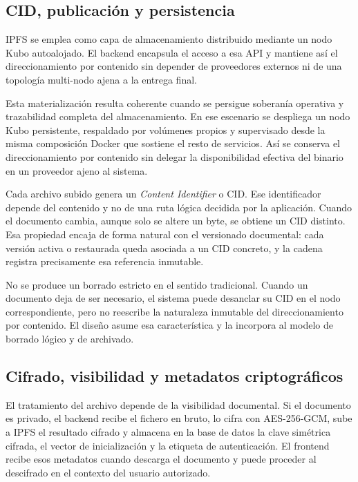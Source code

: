 \documentclass[11pt, a4paper]{article}
\begin{document}
\subsection{CID, publicación y persistencia}

IPFS se emplea como capa de almacenamiento distribuido mediante un nodo Kubo autoalojado. El backend encapsula el acceso a esa API y mantiene así el direccionamiento por contenido sin depender de proveedores externos ni de una topología multi-nodo ajena a la entrega final.

Esta materialización resulta coherente cuando se persigue soberanía operativa y trazabilidad completa del almacenamiento. En ese escenario se despliega un nodo Kubo persistente, respaldado por volúmenes propios y supervisado desde la misma composición Docker que sostiene el resto de servicios. Así se conserva el direccionamiento por contenido sin delegar la disponibilidad efectiva del binario en un proveedor ajeno al sistema.

Cada archivo subido genera un \textit{Content Identifier} o CID. Ese identificador depende del contenido y no de una ruta lógica decidida por la aplicación. Cuando el documento cambia, aunque solo se altere un byte, se obtiene un CID distinto. Esa propiedad encaja de forma natural con el versionado documental: cada versión activa o restaurada queda asociada a un CID concreto, y la cadena registra precisamente esa referencia inmutable.

No se produce un borrado estricto en el sentido tradicional. Cuando un documento deja de ser necesario, el sistema puede desanclar su CID en el nodo correspondiente, pero no reescribe la naturaleza inmutable del direccionamiento por contenido. El diseño asume esa característica y la incorpora al modelo de borrado lógico y de archivado.

\subsection{Cifrado, visibilidad y metadatos criptográficos}

El tratamiento del archivo depende de la visibilidad documental. Si el documento es privado, el backend recibe el fichero en bruto, lo cifra con AES-256-GCM, sube a IPFS el resultado cifrado y almacena en la base de datos la clave simétrica cifrada, el vector de inicialización y la etiqueta de autenticación. El frontend recibe esos metadatos cuando descarga el documento y puede proceder al descifrado en el contexto del usuario autorizado.
\end{document}
